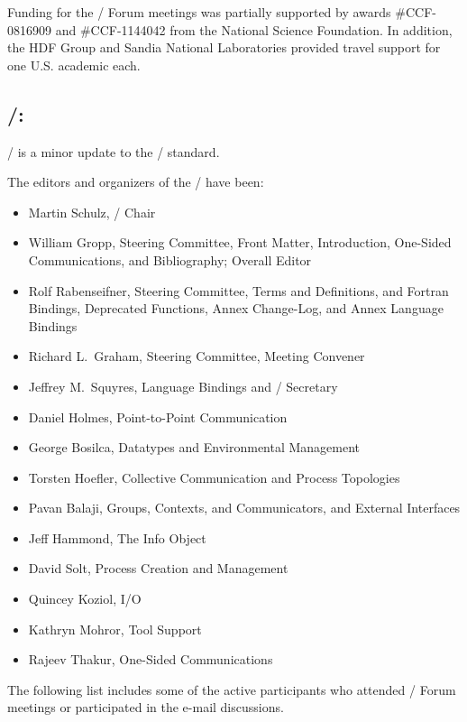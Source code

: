 \medskip

Funding for the \MPI/ Forum meetings was partially supported by
awards 
\#CCF-0816909 and \#CCF-1144042 from the National
Science Foundation. 
In addition, the HDF Group and Sandia National Laboratories provided
travel support for one U.S. academic each.

\subsection*{\MPIIIIDOTI/:}
\MPIIIIDOTI/ is a minor update to the \MPI/ standard.

\noindent The editors and organizers of the \MPIIIIDOTI/ have been:
\begin{itemize}
\item Martin Schulz, \MPIIIIDOTI/ Chair
\item William Gropp, Steering Committee, Front Matter, Introduction,
One-Sided Communications, and Bibliography; Overall Editor
\item Rolf Rabenseifner, Steering Committee, Terms and Definitions, and
  Fortran Bindings,
  Deprecated Functions, Annex Change-Log, and Annex Language Bindings
\item Richard L.~Graham,  Steering Committee, Meeting Convener
\item Jeffrey M.~Squyres, Language Bindings and \MPIIIIDOTI/ Secretary
\item Daniel Holmes, Point-to-Point Communication
\item George Bosilca, Datatypes and Environmental Management
\item Torsten Hoefler, Collective Communication and Process Topologies
\item Pavan Balaji, Groups, Contexts, and Communicators, and External Interfaces
\item Jeff Hammond, The Info Object
\item David Solt, Process Creation and Management
\item Quincey Koziol, I/O
\item Kathryn Mohror, Tool Support
\item Rajeev Thakur, One-Sided Communications
\end{itemize}

The following list includes some of the active participants who
attended \MPI/ Forum meetings or participated in the e-mail
discussions. %

